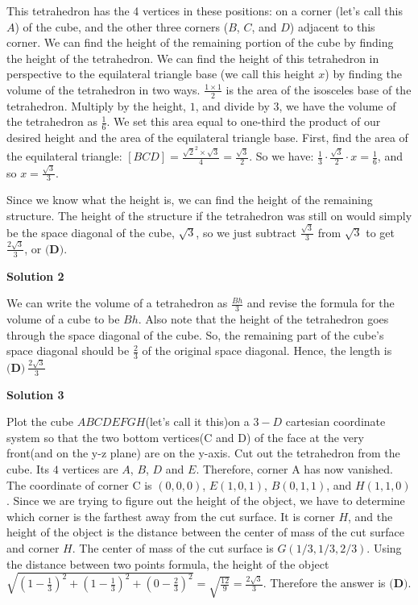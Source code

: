 \begin{enumerate}
This tetrahedron has the 4 vertices in these positions: on a corner (let's call this $A$) of the cube, and the other three corners ($B$, $C$, and $D$) adjacent to this corner. We can find the height of the remaining portion of the cube by finding the height of the tetrahedron. We can find the height of this tetrahedron in perspective to the equilateral triangle base (we call this height $x$) by finding the volume of the tetrahedron in two ways. $\frac{1 \times 1}{2}$ is the area of the isosceles base of the tetrahedron. Multiply by the height, $1$, and divide by $3$, we have the volume of the tetrahedron as $\frac{1}{6}$. We set this area equal to one-third the product of our desired height and the area of the equilateral triangle base. First, find the area of the equilateral triangle: $[BCD]=\frac{\sqrt{2}^2 \times \sqrt{3}}{4}=\frac{\sqrt{3}}{2}$. So we have: $\frac{1}{3} \cdot \frac{\sqrt{3}}{2} \cdot x=\frac{1}{6}$, and so $x=\frac{\sqrt{3}}{3}$. 

 Since we know what the height is, we can find the height of the remaining structure. The height of the structure if the tetrahedron was still on would simply be the space diagonal of the cube, $\sqrt{3}$, so we just subtract $\frac{\sqrt{3}}{3}$ from $\sqrt{3}$ to get $\frac{2\sqrt{3}}{3}$, or $\boxed{\textbf{(D)}}.$




\textbf{Solution 2}

We can write the volume of a tetrahedron as $\frac{Bh}{3}$ and revise the formula for the volume of a cube to be $Bh$. Also note that the height of the tetrahedron goes through the space diagonal of the cube. So, the remaining part of the cube's space diagonal should be $\frac{2}{3}$ of the original space diagonal. Hence, the length is $\boxed{\textbf{(D)} \: \frac{2\sqrt{3}}{3}}$




\textbf{Solution 3}

Plot the cube $ABCDEFGH$(let's call it this)on a $3-D$ cartesian coordinate system so that the two bottom vertices(C and D) of the face at the very front(and on the y-z plane) are on the y-axis. Cut out the tetrahedron from the cube. Its $4$ vertices are $A$, $B$, $D$ and $E.$ Therefore, corner A has now vanished. The coordinate of corner C is $(0,0,0)$, $E(1,0,1)$, $B(0,1,1)$, and $H(1,1,0)$. Since we are trying to figure out the height of the object, we have to determine which corner is the farthest away from the cut surface. It is corner $H$, and the height of the object is the distance between the center of mass of the cut surface and corner $H$. The center of mass of the cut surface is $G(1/3, 1/3, 2/3)$. Using the distance between two points formula, the height of the object $\sqrt{(1-\frac{1}{3})^{2}+(1-\frac{1}{3})^{2}+(0-\frac{2}{3})^{2}}=\sqrt{\frac{12}{9}}=\frac{2\sqrt{3}}{3}$. Therefore the answer is   $\boxed{\textbf{(D)}}.$





\end{enumerate}
